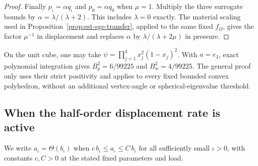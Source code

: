 \documentclass[11pt,a4paper]{article}
\theoremstyle{remark}
\numberwithin{equation}{section}
\begin{document}
\begin{proof}
Finally $p_\iota=\alpha q_\iota$ and $p_0=\alpha q_0$ when $\mu=1$.
Multiply the three surrogate bounds by $\alpha=\lambda/(\lambda+2)$.
This includes $\lambda=0$ exactly. The material scaling used in
Proposition~\ref{prop:est-sge-transfer}, applied to the same fixed
$f_\Omega$, gives the factor $\mu^{-1}$ in displacement and replaces
$\alpha$ by $\lambda/(\lambda+2\mu)$ in pressure.
\end{proof}

On the unit cube, one may take
$\psi=\prod_{j=1}^3x_j^2(1-x_j)^2$.
With $a=e_3$, exact polynomial integration gives
$B_p^2=6/99225$ and $B_w^2=4/99225$.
The general proof only uses their strict positivity and applies to every
fixed bounded convex polyhedron, without an additional vertex-angle or
spherical-eigenvalue threshold.


\subsection{When the half-order displacement rate is active}

We write $a_\iota=\Theta(b_\iota)$ when $c\,b_\iota\le a_\iota
\le C\,b_\iota$ for all sufficiently small $\iota>0$, with constants
$c,C>0$ at the stated fixed parameters and load.
\end{document}
